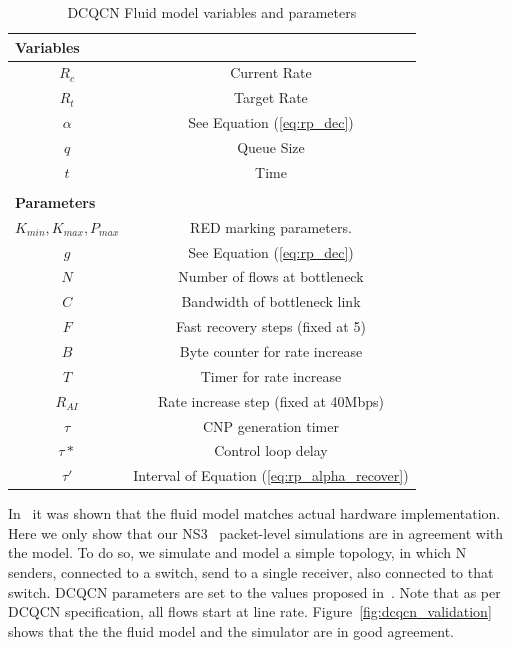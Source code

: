 \begin{table}
\center
{
\footnotesize
{
\begin{tabular}{|c|c|}
\multicolumn{2}{l}{\bf Variables} \\ \hline
$R_c$ & Current Rate \\ \hline
$R_t$ & Target Rate \\ \hline
$\alpha$ & See Equation (\ref{eq:rp_dec}) \\ \hline
$q$ & Queue Size \\ \hline
$t$ & Time \\ \hline
\multicolumn{2}{c}{} \\
\multicolumn{2}{l}{\bf Parameters} \\ \hline
$K_{min}, K_{max}, P_{max}$ & RED marking parameters. \\ \hline
$g$ & See Equation (\ref{eq:rp_dec}) \\ \hline
$N$ & Number of flows at bottleneck\\ \hline
$C$ & Bandwidth of bottleneck link\\ \hline
$F$ & Fast recovery steps (fixed at 5) \\ \hline
$B$ & Byte counter for rate increase\\ \hline
$T$ & Timer for rate increase\\ \hline
$R_{AI}$ & Rate increase step (fixed at 40Mbps)\\ \hline
$\tau$ & CNP generation timer \\ \hline
$\tau *$ & Control loop delay \\ \hline
$\tau '$ & Interval of Equation (\ref{eq:rp_alpha_recover})\\ \hline
\end{tabular}
}
}
\caption{DCQCN Fluid model variables and parameters}
\label{tab:dcqcn_varparam}
\end{table}

In~\cite{dcqcn} it was shown that the fluid model matches actual hardware
implementation. Here we only show that our NS3~\cite{ns3} packet-level
simulations are in agreement with the model.  To do so, we simulate and model a
simple topology, in which N senders, connected to a switch, send to a single
receiver, also connected to that switch. DCQCN parameters are set to the values
proposed in~\cite{dcqcn}. Note that as per DCQCN specification, all flows start
at line rate. Figure~\ref{fig:dcqcn_validation} shows that the the fluid model
and the simulator are in good agreement.

